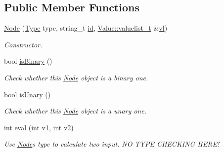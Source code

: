 \subsection*{Public Member Functions}
\begin{DoxyCompactItemize}
\item 
\hyperlink{class_d_f_p_1_1_node_a41c5c2dfd058d717e46d33e8e2946d91}{Node} (\hyperlink{class_d_f_p_1_1_node_a31d945c7278c3587d6d28c76b0f1ae81}{Type} type, string\+\_\+t \hyperlink{class_d_f_p_1_1_node_a7fb4f15a2c154c960f64797fc887fc75}{id}, \hyperlink{class_d_f_p_1_1_value_a2ca981be3c47c7d23213c08379d3c947}{Value\+::valuelist\+\_\+t} \&\hyperlink{class_d_f_p_1_1_node_aa9e4196de8f357a432508d1bf171a011}{vl})
\begin{DoxyCompactList}\small\item\em Constructor. \end{DoxyCompactList}\item 
bool \hyperlink{class_d_f_p_1_1_node_a61a5b15793ee6f9656c46f4b3f05196a}{is\+Binary} ()
\begin{DoxyCompactList}\small\item\em Check whether this \hyperlink{class_d_f_p_1_1_node}{Node} object is a binary one. \end{DoxyCompactList}\item 
bool \hyperlink{class_d_f_p_1_1_node_afce4058fc5988eb4bf7a33fd519c4d2e}{is\+Unary} ()\hypertarget{class_d_f_p_1_1_node_afce4058fc5988eb4bf7a33fd519c4d2e}{}\label{class_d_f_p_1_1_node_afce4058fc5988eb4bf7a33fd519c4d2e}

\begin{DoxyCompactList}\small\item\em Check whether this \hyperlink{class_d_f_p_1_1_node}{Node} object is a unary one. \end{DoxyCompactList}\item 
int \hyperlink{class_d_f_p_1_1_node_a5abdd9f8ff1d0238fb92f2bf20bd52a1}{eval} (int v1, int v2)\hypertarget{class_d_f_p_1_1_node_a5abdd9f8ff1d0238fb92f2bf20bd52a1}{}\label{class_d_f_p_1_1_node_a5abdd9f8ff1d0238fb92f2bf20bd52a1}

\begin{DoxyCompactList}\small\item\em Use \hyperlink{class_d_f_p_1_1_node}{Node}\textquotesingle{}s type to calculate two input. NO T\+Y\+PE C\+H\+E\+C\+K\+I\+NG H\+E\+R\+E! \end{DoxyCompactList}\end{DoxyCompactItemize}
